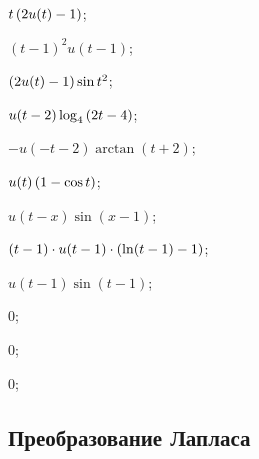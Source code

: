 \begin{enumsols}
		\item \( t \left( 2u(t) - 1 \right) \); \sfill %
		\item \( (t-1)^2 u(t-1) \); \sfill %
		\item \( \left( 2u(t) - 1 \right) \sin{t^2} \); \sfill %
		\item \( u(t-2) \log_4\left( 2t-4 \right) \); \sfill %
		\item \( -u(-t-2) \arctan(t+2) \); \sfill %
		\item \( u(t)\left( 1 - \cos{t} \right) \); \sfill %
		\item \( u(t-x) \sin(x-1) \); \sfill %
		\item \( (t-1) \cdot u(t-1) \cdot \left( \ln(t-1) - 1 \right) \); \sfill %
		\item \( u(t-1) \sin(t-1) \); \sfill %
		\item \( 0 \); \sfill %
		\item \( 0 \); \sfill %
		\item \( 0 \); \sfill %

	\end{enumsols}

\subsection*{Преобразование Лапласа}

